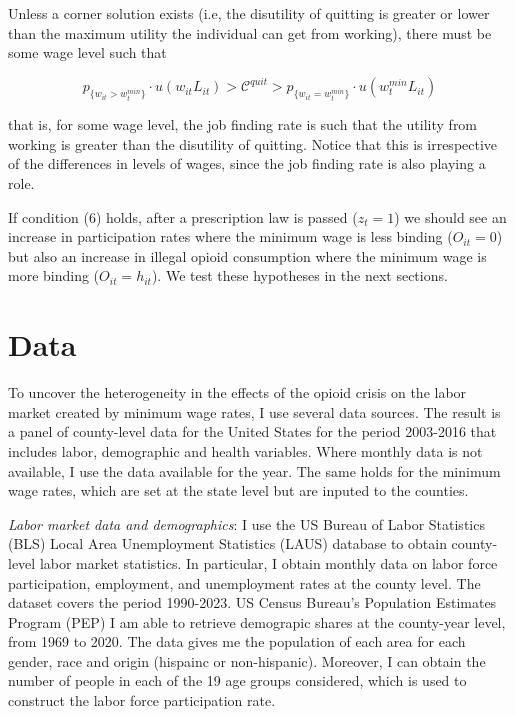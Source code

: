 \documentclass[12pt,a4paper]{article}
\begin{document}
Unless a corner solution exists (i.e, the disutility of quitting is greater or lower than the maximum utility the individual can get from working), there must be some wage level such that

\begin{equation}
    p_{\{w_{it} > w^{min}_t\}}\cdot u(w_{it}L_{it}) > \mathcal{C}^{quit} > p_{\{w_{it} = w^{min}_t\}}\cdot u(w^{min}_t L_{it})
\end{equation}

that is, for some wage level, the job finding rate is such that the utility from working is greater than the disutility of quitting.
Notice that this is irrespective of the differences in levels of wages, since the job finding rate is also playing a role.

If condition (6) holds, after a prescription law is passed (\(z_{t} = 1\)) we should see an increase in participation rates where the minimum wage is less binding (\(O_{it} = 0\)) but also an increase in illegal opioid consumption where the minimum wage is more binding (\(O_{it} = h_{it}\)).
We test these hypotheses in the next sections.

\section*{Data}

To uncover the heterogeneity in the effects of the opioid crisis on the labor market created by minimum wage rates, I use several data sources.
The result is a panel of county-level data for the United States for the period 2003-2016 that includes labor, demographic and health variables.
Where monthly data is not available, I use the data available for the year.
The same holds for the minimum wage rates, which are set at the state level but are inputed to the counties.

\textit{Labor market data and demographics}: I use the US Bureau of Labor Statistics (BLS) Local Area Unemployment Statistics (LAUS) database to obtain county-level labor market statistics. 
In particular, I obtain monthly data on labor force participation, employment, and unemployment rates at the county level.
The dataset covers the period 1990-2023. US Census Bureau's Population Estimates Program (PEP) I am able to retrieve demograpic shares at the county-year level, from 1969 to 2020.
The data gives me the population of each area for each gender, race and origin (hispainc or non-hispanic).
Moreover, I can obtain the number of people in each of the 19 age groups considered, which is used to construct the labor force participation rate.
\end{document}
